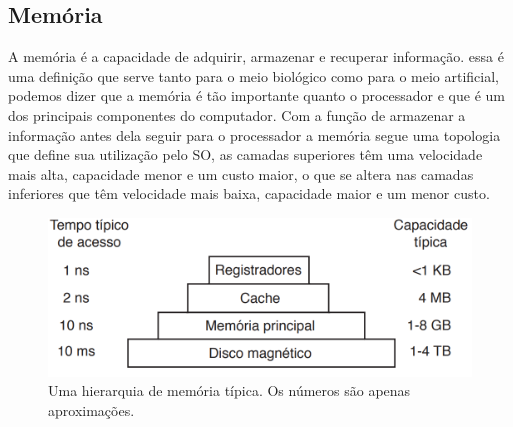 \subsection{Memória}
A memória é a capacidade de adquirir, armazenar e recuperar informação. essa é uma definição que serve tanto para o meio biológico como para o meio artificial, podemos dizer que a memória  é tão importante quanto o processador e que é um dos principais componentes do computador. 
Com a função de armazenar a informação antes dela seguir para o processador a memória segue uma topologia que define sua utilização pelo SO, as camadas superiores têm uma velocidade mais alta, capacidade menor e um custo maior, o que se altera nas camadas inferiores que têm velocidade mais baixa, capacidade maior e um menor custo.
\begin{figure}[htpb]
    \centering
   \includegraphics[scale=0.5]{imagens/lvlmemoria.png}
   \caption{Uma hierarquia de memória típica. Os números são apenas aproximações. \cite{Tanenbaum2016}}
   \label{fig:lvlmemoria}
\end{figure}\\

